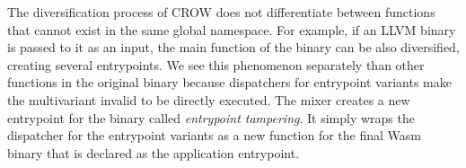 The diversification process of CROW does not differentiate between functions that cannot exist in the same global namespace. For example, if an LLVM binary is passed to it as an input, the main function of the binary can be also diversified, creating several entrypoints. We see this phenomenon separately than other functions in the original binary because dispatchers for entrypoint variants make the multivariant invalid to be directly executed. 
The \tool mixer creates a new entrypoint for the binary called \emph{entrypoint tampering}.
It simply wraps the dispatcher for the entrypoint variants as a new function for the final Wasm binary that is declared as the application entrypoint. 




